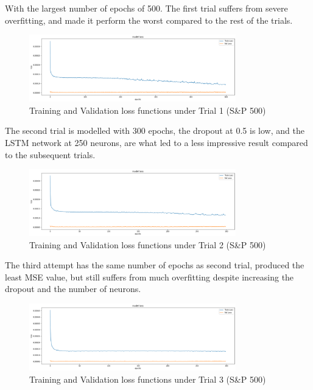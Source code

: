 \documentclass[a4paper,11pt,oneside]{book}
\begin{document}
With the largest number of epochs of 500. The first trial suffers from severe overfitting, and made it perform the worst compared to the rest of the trials.\newline
\begin{figure}[!h]
	\centering
	\includegraphics[width=0.8\textwidth]{figures/sanp1}
	\caption{Training and Validation loss functions under Trial 1 (S\&P 500)}
	\label{sanp1}
\end{figure}
\newline The second trial is modelled with 300 epochs, the dropout at 0.5 is low, and the LSTM network at 250 neurons, are what
led to a less impressive result compared to the subsequent trials. \newline\newline\newline\newline\newline\newline\newline\newline\newline\newline\newline
\begin{figure}[!h]
	\centering
	\includegraphics[width=0.8\textwidth]{figures/sanp2}
	\caption{Training and Validation loss functions under Trial 2 (S\&P 500)}
	\label{sanp2}
\end{figure}
\newline The third attempt has the same number of epochs as second trial, produced the least MSE value, but still suffers from much overfitting despite increasing the dropout and the number of neurons.\newline
\begin{figure}[!h]
	\centering
	\includegraphics[width=0.8\textwidth]{figures/sanp3}
	\caption{Training and Validation loss functions under Trial 3 (S\&P 500)}
	\label{sanp3}
\end{figure}
\end{document}
